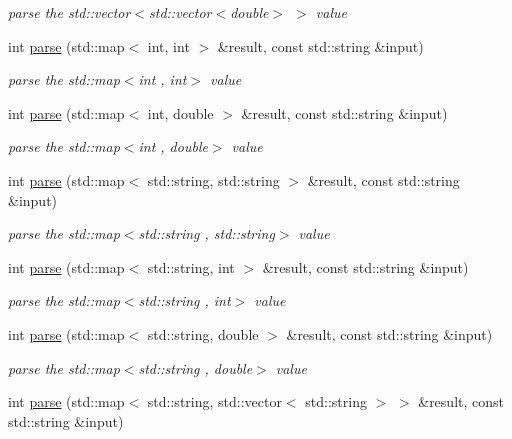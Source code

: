 \begin{DoxyCompactItemize}
\begin{DoxyCompactList}\small\item\em parse the {\ttfamily std\+::vector$<$std\+::vector$<$double$>$ $>$} value \end{DoxyCompactList}\item 
int \hyperlink{namespace_d_d4hep_1_1_parsers_ac82777050fc05e43dcd2e5fa4648cfb5}{parse} (std\+::map$<$ int, int $>$ \&result, const std\+::string \&input)
\begin{DoxyCompactList}\small\item\em parse the {\ttfamily std\+::map$<$int , int$>$} value \end{DoxyCompactList}\item 
int \hyperlink{namespace_d_d4hep_1_1_parsers_a948c73c7e48e93c657c717952295ce22}{parse} (std\+::map$<$ int, double $>$ \&result, const std\+::string \&input)
\begin{DoxyCompactList}\small\item\em parse the {\ttfamily std\+::map$<$int , double$>$} value \end{DoxyCompactList}\item 
int \hyperlink{namespace_d_d4hep_1_1_parsers_a5c68b3129b287e0e4c0a8aa6c97224d2}{parse} (std\+::map$<$ std\+::string, std\+::string $>$ \&result, const std\+::string \&input)
\begin{DoxyCompactList}\small\item\em parse the {\ttfamily std\+::map$<$std\+::string , std\+::string$>$} value \end{DoxyCompactList}\item 
int \hyperlink{namespace_d_d4hep_1_1_parsers_a0bb67dd0bd4f1932c18d9fdf190b0387}{parse} (std\+::map$<$ std\+::string, int $>$ \&result, const std\+::string \&input)
\begin{DoxyCompactList}\small\item\em parse the {\ttfamily std\+::map$<$std\+::string , int$>$} value \end{DoxyCompactList}\item 
int \hyperlink{namespace_d_d4hep_1_1_parsers_a3bb4178f3175f409b144ff5629463c14}{parse} (std\+::map$<$ std\+::string, double $>$ \&result, const std\+::string \&input)
\begin{DoxyCompactList}\small\item\em parse the {\ttfamily std\+::map$<$std\+::string , double$>$} value \end{DoxyCompactList}\item 
int \hyperlink{namespace_d_d4hep_1_1_parsers_a010112afc7cbf060b08876d5d4dee7d5}{parse} (std\+::map$<$ std\+::string, std\+::vector$<$ std\+::string $>$ $>$ \&result, const std\+::string \&input)

\end{DoxyCompactItemize}
